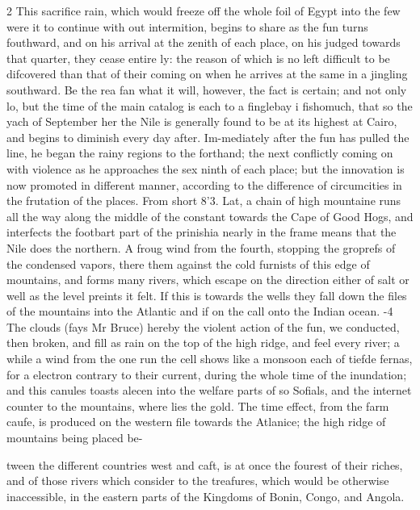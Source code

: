 \documentclass[10pt]{article}
\begin{document}
\begin{multicols}{2}
This sacrifice rain, which would freeze off the whole foil of Egypt into the few were it to continue with out intermition, begins to share as the fun turns fouthward, and on his arrival at the zenith of each place, on his judged towards that quarter, they cease entire ly: the reason of which is no left difficult to be difcovered than that of their coming on when he arrives at the same in a jingling southward. Be the rea fan what it will, however, the fact is certain; and not only lo, but the time of the main catalog is each to a finglebay i fishomuch, that so the yach of September her the Nile is generally found to be at its highest at Cairo, and begins to diminish every day after. Im-mediately after the fun has pulled the line, he began the rainy regions to the forthand; the next conflictly coming on with violence as he approaches the sex ninth of each place; but the innovation is now promoted in different manner, according to the difference of circumcities in the frutation of the places. From short 8’3. Lat, a chain of high mountaine runs all the way along the middle of the constant towards the Cape of Good Hogs, and interfects the footbart part of the prinishia nearly in the frame means that the Nile does the northern. A froug wind from the fourth, stopping the groprefs of the condensed vapors, there them against the cold furnists of this edge of mountains, and forms many rivers, which escape on the direction either of salt or well as the level preints it felt. If this is towards the wells they fall down the files of the mountains into the Atlantic and if on the call onto the Indian ocean. -4 The clouds (fays Mr Bruce) hereby the violent action of the fun, we conducted, then broken, and fill as rain on the top of the high ridge, and feel every river; a while a wind from the one run the cell shows like a monsoon each of tiefde fernas, for a electron contrary to their current, during the whole time of the inundation; and this canules toasts alecen into the welfare parts of so Sofials, and the internet counter to the mountains, where lies the gold. The time effect, from the farm caufe, is produced on the western file towards the Atlanice; the high ridge of mountains being placed be-

tween the different countries west and caft, is at once the fourest of their riches, and of those rivers which consider to the treafures, which would be otherwise inaccessible, in the eastern parts of the Kingdoms of Bonin, Congo, and Angola.


\end{multicols}
\end{document}
